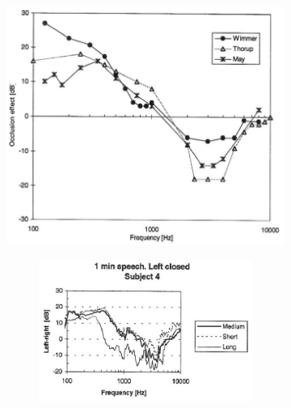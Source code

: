 \documentclass[dissertation,copyright]{uathesis}
\begin{document}
\begin{figure}
\begin{subfigure}{0.5\textwidth}
  \includegraphics[width=1\textwidth]{figure/hansenAverageOE.png}
  \caption{ }
  \label{fig:hansenAverageOEa}
\end{subfigure}%
\hfill
\begin{subfigure}{0.5\textwidth}
  \begin{subfigure}{1\textwidth}
    \includegraphics[width=1\textwidth]{figure/Hansen_OE-plot_a.png}
  \end{subfigure}
  \begin{subfigure}{1\textwidth}

\end{subfigure}
\end{subfigure}
\end{figure}
\end{document}
